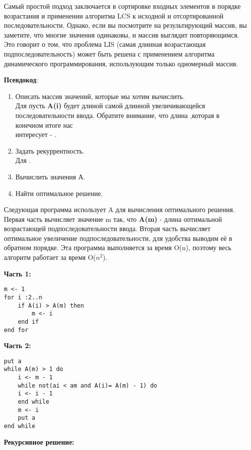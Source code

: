 Самый простой подход заключается в сортировке входных элементов в
порядке возрастания и применении алгоритма LCS к исходной и
отсортированной последовательности. Однако, если вы посмотрите на
результирующий массив, вы заметите, что многие значения одинаковы, и
массив выглядит повторяющимся. Это говорит о том, что проблема LIS (самая
длинная возрастающая подпоследовательность) может быть решена с
применением алгоритма динамического программирования, использующим
только одномерный массив.
\vspace{\baselineskip}

\textbf{Псевдокод}:
\begin{enumerate}
    \item Описать массив значений, которые мы хотим вычислить.\\
Для  пусть \textbf{A(i)} будет длиной самой длинной увеличивающейся
последовательности ввода. Обратите внимание, что длина ,которая в
конечном итоге нас\\ интересует - .
    \item Задать рекуррентность.\\
Для .
    \item Вычислить значения А.
    \item Найти оптимальное решение.
\end{enumerate}
\vspace{\baselineskip}
Следующая программа использует A для вычисления оптимального
решения. Первая часть вычисляет значение m так, что \textbf{A(m)} - длина
оптимальной возрастающей подпоследовательности ввода. Вторая часть
вычисляет оптимальное увеличение подпоследовательности, для удобства
выводим её в обратном порядке. Эта программа выполняется за время O(n),
поэтому весь алгоритм работает за время O($n^2$).
\vspace{\baselineskip}

\textbf{Часть 1:}
\vspace{\baselineskip}
\begin{tcolorbox}
\begin{verbatim}     
m <- 1
for i :2..n
    if A(i) > A(m) then
        m <- i    
    end if
end for
\end{verbatim}
\end{tcolorbox}
\vspace{\baselineskip}
\textbf{Часть 2:}
\vspace{\baselineskip}
\begin{tcolorbox}
\begin{verbatim}     
put a
while A(m) > 1 do
    i <- m - 1
    while not(ai < am and A(i)= A(m) - 1) do
    i <- i - 1
    end while
    m <- i
    put a 
end while
\end{verbatim}
\end{tcolorbox}
\vspace{\baselineskip}
\textbf{Рекурсивное решение:}
\vspace{\baselineskip}

